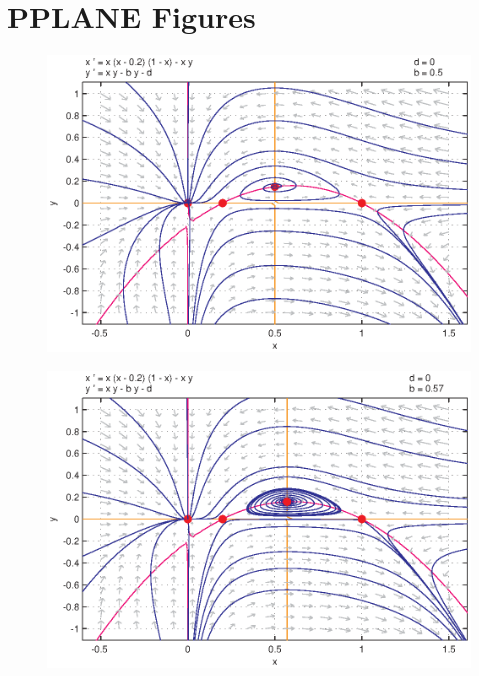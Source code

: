 \documentclass[a4paper, 11pt]{article}
\begin{document}

\tableofcontents
\clearpage


\clearpage

\clearpage

\clearpage

\clearpage





\clearpage
\appendix
\section{PPLANE Figures}
\begin{figure}[htp]
\centering
\includegraphics{img/ex3/PPLANE1.eps}
\caption{}
\label{fig:PPLANE1}
\end{figure}
\begin{figure}[H]
\centering
\includegraphics{img/ex3/PPLANE2.eps}
\caption{}
\label{fig:}
\end{figure}
\end{document}
